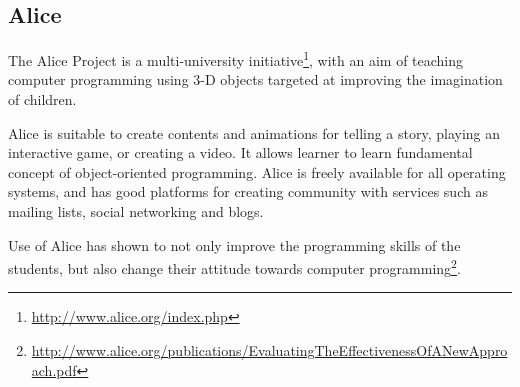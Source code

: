 \subsection{Alice}
The Alice Project is a multi-university initiative\footnote{\url{http://www.alice.org/index.php}}, with an aim of teaching computer programming using 3-D objects targeted at improving the imagination of children.

Alice is suitable to create contents and animations for telling a story, playing an interactive game, or creating a video. It allows learner to learn fundamental concept of object-oriented programming. Alice is freely available for all operating systems, and has good platforms for creating community with services such as mailing lists, social networking and blogs.

Use of Alice has shown to not only improve the programming skills of the students, but also change their attitude towards computer programming\footnote{\url{http://www.alice.org/publications/EvaluatingTheEffectivenessOfANewApproach.pdf}}.






